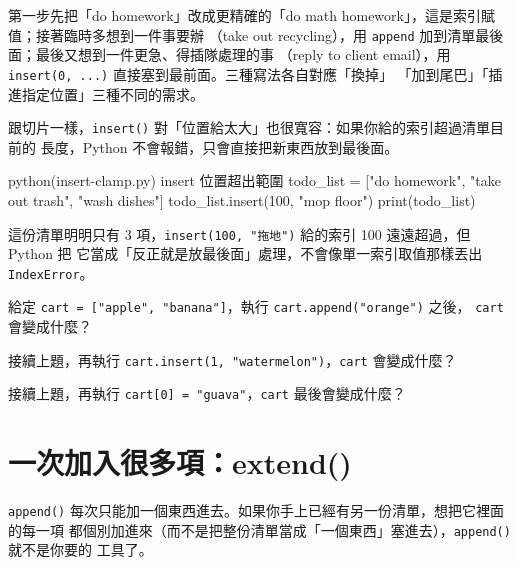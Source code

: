 
第一步先把「do homework」改成更精確的「do math homework」，這是索引賦值；接著臨時多想到一件事要辦
（take out recycling），用 \texttt{append} 加到清單最後面；最後又想到一件更急、得插隊處理的事
（reply to client email），用 \texttt{insert(0, ...)} 直接塞到最前面。三種寫法各自對應「換掉」
「加到尾巴」「插進指定位置」三種不同的需求。

跟切片一樣，\texttt{insert()} 對「位置給太大」也很寬容：如果你給的索引超過清單目前的
長度，Python 不會報錯，只會直接把新東西放到最後面。

\begin{example}{python}{(insert-clamp.py) insert 位置超出範圍}
todo_list = ["do homework", "take out trash", "wash dishes"]
todo_list.insert(100, "mop floor")
print(todo_list)
\end{example}


這份清單明明只有 3 項，\texttt{insert(100, "拖地")} 給的索引 100 遠遠超過，但 Python 把
它當成「反正就是放最後面」處理，不會像單一索引取值那樣丟出 \texttt{IndexError}。

\begin{drills}[label=drills:list-add]
\item 給定 \texttt{cart = ["apple", "banana"]}，執行 \texttt{cart.append("orange")} 之後，
\texttt{cart} 會變成什麼？
\item 接續上題，再執行 \texttt{cart.insert(1, "watermelon")}，\texttt{cart} 會變成什麼？
\item 接續上題，再執行 \texttt{cart[0] = "guava"}，\texttt{cart} 最後會變成什麼？
\end{drills}

\section{一次加入很多項：extend()}
\label{sec:list-extend}

\texttt{append()} 每次只能加一個東西進去。如果你手上已經有另一份清單，想把它裡面的每一項
都個別加進來（而不是把整份清單當成「一個東西」塞進去），\texttt{append()} 就不是你要的
工具了。

